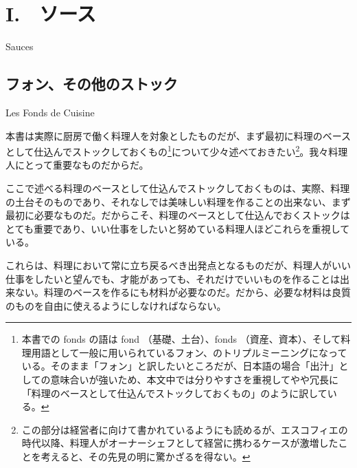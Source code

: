 \mainmatter

\begin{main}

\hypertarget{sauces}{%
\chapter{I.　ソース}\label{sauces}}

\begin{frchapenv}

Sauces

\end{frchapenv}

\hypertarget{les-fonds-de-cuisine}{%
\section{フォン、その他のストック}\label{les-fonds-de-cuisine}}

\begin{frsecenv}

Les Fonds de Cuisine

\end{frsecenv}

 

\normalsize
{}

本書は実際に厨房で働く料理人を対象としたものだが、まず最初に料理のベースとして仕込んでストックしておくもの\footnote{本書での
  fonds の語は fond （基礎、土台）、fonds
  （資産、資本）、そして料理用語として一般に用いられているフォン、のトリプルミーニングになっている。そのまま「フォン」と訳したいところだが、日本語の場合「出汁」としての意味合いが強いため、本文中では分りやすさを重視してやや冗長に「料理のベースとして仕込んでストックしておくもの」のように訳している。}について少々述べておきたい\footnote{この部分は経営者に向けて書かれているようにも読めるが、エスコフィエの時代以降、料理人がオーナーシェフとして経営に携わるケースが激増したことを考えると、その先見の明に驚かざるを得ない。}。我々料理人にとって重要なものだからだ。

ここで述べる料理のベースとして仕込んでストックしておくものは、実際、料理の土台そのものであり、それなしでは美味しい料理を作ることの出来ない、まず最初に必要なものだ。だからこそ、料理のベースとして仕込んでおくストックはとても重要であり、いい仕事をしたいと努めている料理人ほどこれらを重視している。

これらは、料理において常に立ち戻るべき出発点となるものだが、料理人がいい仕事をしたいと望んでも、才能があっても、それだけでいいものを作ることは出来ない。料理のベースを作るにも材料が必要なのだ。だから、必要な材料は良質のものを自由に使えるようにしなければならない。


\end{main}
